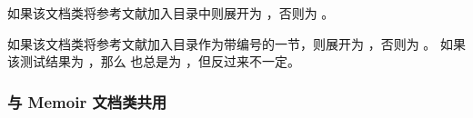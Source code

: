 \begin{ltxsyntax}



如果该文档类将参考文献加入目录中则展开为 ，否则为 。



如果该文档类将参考文献加入目录作为带编号的一节，则展开为 ，否则为 。
如果该测试结果为 ，那么  也总是为 ，但反过来不一定。

\end{ltxsyntax}

\subsubsection{与 Memoir 文档类共用}%
\label{use:cav:mem}


